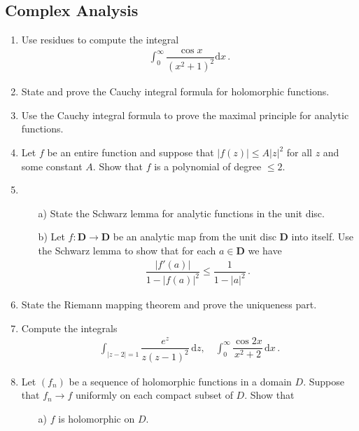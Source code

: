 \documentclass[11pt]{amsart}
\theoremstyle{plain}
\theoremstyle{definition}
\theoremstyle{remark}
\begin{document}
\subsection{Complex Analysis}
\begin{enumerate}
    \item Use residues to compute the integral
    \begin{align*}
        \int_{0}^{\infty} \dfrac{\cos x}{(x^2+1)^2} \mathrm{d}x \, .
    \end{align*}
    
    \item State and prove the Cauchy integral formula for holomorphic functions.
    
    \item Use the Cauchy integral formula to prove the maximal principle for analytic functions.
    
    \item Let $f$ be an entire function and suppose that $|f(z)| \leq A|z|^2$ for all $z$ and some constant $A$. Show that $f$ is a polynomial of degree $\leq 2$.
    
    \item \begin{enumerate}
        \item[a)] State the Schwarz lemma for analytic functions in the unit disc.
        
        \item[b)] Let $f: \mathbf{D} \to \mathbf{D}$ be an analytic map from the unit disc $\mathbf{D}$ into itself. Use the Schwarz lemma to show that for each $a\in \mathbf{D}$ we have
     \begin{align*}
         \dfrac{|f'(a)|}{1-|f(a)|^2} \leq \dfrac{1}{1-|a|^2} \, .
     \end{align*}
    \end{enumerate}
    
    \item State the Riemann mapping theorem and prove the uniqueness part.
    
    \item Compute the integrals
    \begin{align*}
        \int_{|z-2|=1} \dfrac{e^z}{z(z-1)^2} \, 
        \mathrm{d}z, \quad \int_0^\infty \dfrac{\cos 2x}{x^2 + 2} \, \mathrm{d}x \, .
    \end{align*}
    
    \item Let $(f_n)$ be a sequence of holomorphic functions in a domain $D$. Suppose that $f_n \to f$ uniformly on each compact subset of $D$. Show that
    \begin{itemize}
        \item[a)] $f$ is holomorphic on $D$.
        

\end{itemize}
\end{enumerate}
\end{document}
